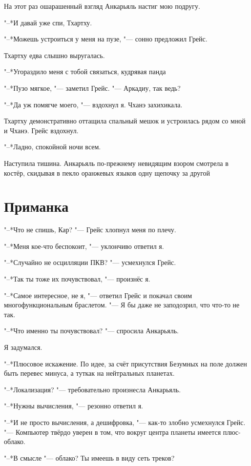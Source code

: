 На этот раз ошарашенный взгляд Анкарьяль настиг мою подругу.

"--*И давай уже спи, Тхартху.

"--*Можешь устроиться у меня на пузе, "--- сонно предложил Грейс.

Тхартху едва слышно выругалась.

"--*Угораздило меня с тобой связаться, кудрявая панда\ldotst

"--*Пузо мягкое, "--- заметил Грейс.
"--- Аркадиу, так ведь?

"--*Да уж помягче моего, "--- вздохнул я.
Чханэ захихикала.

Тхартху демонстративно оттащила спальный мешок и устроилась рядом со мной и Чханэ.
Грейс вздохнул.

"--*Ладно, спокойной ночи всем.

Наступила тишина.
Анкарьяль по-прежнему невидящим взором смотрела в костёр, скидывая в пекло оранжевых языков одну щепочку за другой\ldotst

\section{Приманка}

"--*Что не спишь, Кар? "--- Грейс хлопнул меня по плечу.

"--*Меня кое-что беспокоит, "--- уклончиво ответил я.

"--*Случайно не осцилляции ПКВ? "--- усмехнулся Грейс.

"--*Так ты тоже их почувствовал, "--- произнёс я.

"--*Самое интересное, не я, "--- ответил Грейс и покачал своим многофункциональным браслетом.
"--- Я бы даже не заподозрил, что что-то не так.

"--*Что именно ты почувствовал? "--- спросила Анкарьяль.

Я задумался.

"--*Плюсовое искажение.
По идее, за счёт присутствия Безумных на поле должен быть перевес минуса, а тут\ldotst как на нейтральных планетах.

"--*Локализация? "--- требовательно произнесла Анкарьяль.

"--*Нужны вычисления, "--- резонно ответил я.

"--*И не просто вычисления, а дешифровка, "--- как-то злобно усмехнулся Грейс.
"--- Компьютер твёрдо уверен в том, что вокруг центра планеты имеется плюс-облако.

"--*В смысле "--- облако?
Ты имеешь в виду сеть треков?

